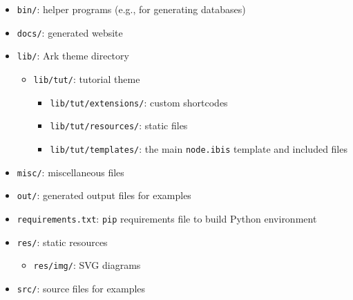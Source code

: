 \documentclass[krantzl]{krantz}
\begin{document}
\begin{itemize}
\begin{itemize}
\end{itemize}


\item \texttt{bin/}: helper programs (e.g., for generating databases)

\item \texttt{docs/}: generated website

\item \texttt{lib/}: Ark theme directory\begin{itemize}
\item \texttt{lib/tut/}: tutorial theme\begin{itemize}
\item \texttt{lib/tut/extensions/}: custom shortcodes

\item \texttt{lib/tut/resources/}: static files

\item \texttt{lib/tut/templates/}: the main \texttt{node.ibis} template and included files

\end{itemize}


\end{itemize}


\item \texttt{misc/}: miscellaneous files

\item \texttt{out/}: generated output files for examples

\item \texttt{requirements.txt}: \texttt{pip} requirements file to build Python environment

\item \texttt{res/}: static resources\begin{itemize}
\item \texttt{res/img/}: SVG diagrams

\end{itemize}


\item \texttt{src/}: source files for examples

\end{itemize}
\end{document}
